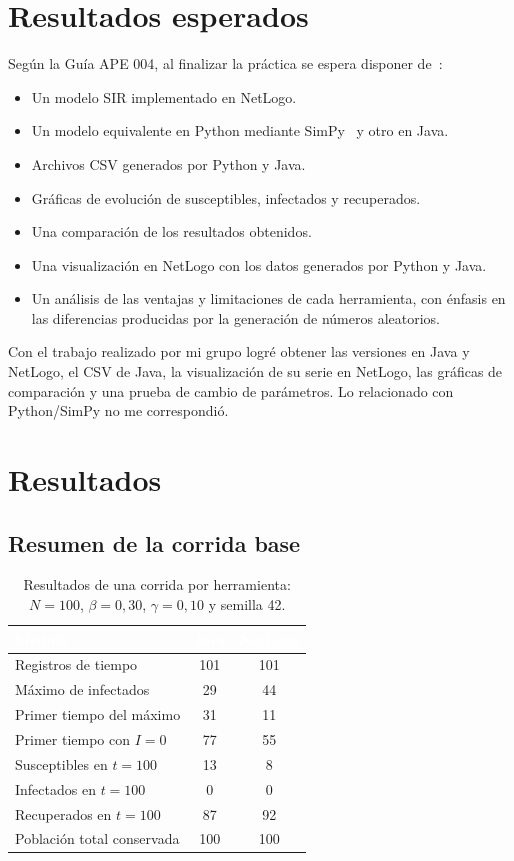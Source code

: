 \documentclass[11pt,a4paper]{article}
\renewcommand{\arraystretch}{1.08}
\newcommand{\cab}[1]{\textbf{\textcolor{white}{#1}}}
\newcommand{\tabestilo}{\arrayrulecolor{borderblue}\setlength{\arrayrulewidth}{0.75pt}\renewcommand{\arraystretch}{1.2}}
\begin{document}
\FloatBarrier
\section{Resultados esperados}
Según la Guía APE 004, al finalizar la práctica se espera disponer de~\cite{guia}:
\begin{itemize}
  \item Un modelo SIR implementado en NetLogo.
  \item Un modelo equivalente en Python mediante SimPy~\cite{simpy} y otro en Java.
  \item Archivos CSV generados por Python y Java.
  \item Gráficas de evolución de susceptibles, infectados y recuperados.
  \item Una comparación de los resultados obtenidos.
  \item Una visualización en NetLogo con los datos generados por Python y Java.
  \item Un análisis de las ventajas y limitaciones de cada herramienta, con énfasis en las diferencias producidas por la generación de números aleatorios.
\end{itemize}
Con el trabajo realizado por mi grupo logré obtener las versiones en Java y NetLogo, el CSV de Java, la visualización de su serie en NetLogo, las gráficas de comparación y una prueba de cambio de parámetros. Lo relacionado con Python/SimPy no me correspondió.

\section{Resultados}

\subsection{Resumen de la corrida base}
\begin{table}[H]
\centering\tabestilo
\begin{tabularx}{\textwidth}{|Y|c|c|}
\hline{}\cab{Medida} & \cab{Java} & \cab{NetLogo} \\ \hline
Registros de tiempo & 101 & 101 \\ \hline
{}Máximo de infectados & 29 & 44 \\ \hline
Primer tiempo del máximo & 31 & 11 \\ \hline
{}Primer tiempo con $I=0$ & 77 & 55 \\ \hline
Susceptibles en $t=100$ & 13 & 8 \\ \hline
{}Infectados en $t=100$ & 0 & 0 \\ \hline
Recuperados en $t=100$ & 87 & 92 \\ \hline
{}Población total conservada & 100 & 100 \\ \hline
\end{tabularx}
\caption{Resultados de una corrida por herramienta: $N=100$, $\beta=0{,}30$, $\gamma=0{,}10$ y semilla 42.}
\label{tab:resultados}
\end{table}
\end{document}
